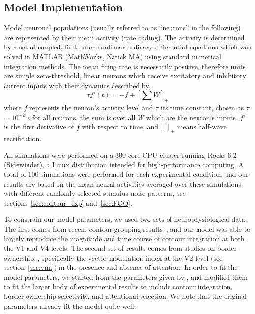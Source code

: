 \subsection{Model Implementation}
\label{sec:implementation}
Model neuronal populations (usually referred to as ``neurons'' in the
following) are represented  by their mean  activity (rate coding). 
The activity is determined by a set of
coupled, first-order nonlinear ordinary differential equations which
was solved in MATLAB (MathWorks, Natick MA) using standard numerical
integration methods. 
The mean firing rate is necessarily positive, therefore units
are simple zero-threshold, linear
neurons which receive excitatory and inhibitory current inputs with
their dynamics described by,
\begin{equation}
\label{eq:1}
\tau f'(t) = -f + \left[ \sum W \right]_{+}
\end{equation}
where $f$ represents the neuron's activity level and $\tau$ its time
constant, chosen as $\tau$ = $10^{-2}$ s for all neurons,
 the sum is over all $W$ which are the neuron's inputs, 
%
$f'$ is the first derivative of $f$ with respect to
time, and $[\,]_{+}$ means half-wave rectification.

All simulations were performed on a 
300-core CPU cluster running Rocks 6.2 (Sidewinder), a Linux
distribution intended for high-performance computing.  A total of 100
simulations were performed for each experimental condition, and our
results are based on the mean neural activities averaged over these
simulations with different randomly selected stimulus noise patterns, see
sections~\ref{sec:contour_exp} and~\ref{sec:FGO}.

To constrain our model parameters, we used two sets of
neurophysiological data. The first comes from recent contour grouping
results~\citep{Chen_etal14}, and our model was able to largely
reproduce the magnitude and time course of contour integration at both
the V1 and V4 levels. The second set of results comes from studies on
border ownership~\citep{Qiu_etal07}, specifically the 
vector
modulation index at the V2 level
(see section~\ref{sec:vmi})
 in the presence and absence of
attention. In order to fit the model parameters, we started from the
parameters given by \cite{Mihalas_etal11b}, and modified them to fit
the larger body of experimental results to include contour
integration, border ownership selectivity, and attentional selection. 
We note that the original parameters already fit the
model quite well.

